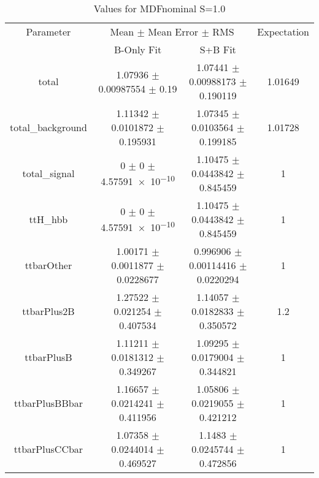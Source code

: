 \begin{table}
\centering
\caption{Values for MDFnominal S=1.0}
\begin{tabular}{cccc}
\toprule
Parameter & \multicolumn{2}{c}{Mean $\pm$ Mean Error $\pm$ RMS} & Expectation\\
 & B-Only Fit & S+B Fit & \\
\midrule
total & \num{1.07936} $\pm$ \num{0.00987554} $\pm$ \num{0.19} & \num{1.07441} $\pm$ \num{0.00988173} $\pm$ \num{0.190119} & \num{1.01649}\\
total\_background & \num{1.11342} $\pm$ \num{0.0101872} $\pm$ \num{0.195931} & \num{1.07345} $\pm$ \num{0.0103564} $\pm$ \num{0.199185} & \num{1.01728}\\
total\_signal & \num{0} $\pm$ \num{0} $\pm$ \num{4.57591e-10} & \num{1.10475} $\pm$ \num{0.0443842} $\pm$ \num{0.845459} & \num{1}\\
ttH\_hbb & \num{0} $\pm$ \num{0} $\pm$ \num{4.57591e-10} & \num{1.10475} $\pm$ \num{0.0443842} $\pm$ \num{0.845459} & \num{1}\\
ttbarOther & \num{1.00171} $\pm$ \num{0.0011877} $\pm$ \num{0.0228677} & \num{0.996906} $\pm$ \num{0.00114416} $\pm$ \num{0.0220294} & \num{1}\\
ttbarPlus2B & \num{1.27522} $\pm$ \num{0.021254} $\pm$ \num{0.407534} & \num{1.14057} $\pm$ \num{0.0182833} $\pm$ \num{0.350572} & \num{1.2}\\
ttbarPlusB & \num{1.11211} $\pm$ \num{0.0181312} $\pm$ \num{0.349267} & \num{1.09295} $\pm$ \num{0.0179004} $\pm$ \num{0.344821} & \num{1}\\
ttbarPlusBBbar & \num{1.16657} $\pm$ \num{0.0214241} $\pm$ \num{0.411956} & \num{1.05806} $\pm$ \num{0.0219055} $\pm$ \num{0.421212} & \num{1}\\
ttbarPlusCCbar & \num{1.07358} $\pm$ \num{0.0244014} $\pm$ \num{0.469527} & \num{1.1483} $\pm$ \num{0.0245744} $\pm$ \num{0.472856} & \num{1}\\
\bottomrule
\end{tabular}
\end{table}